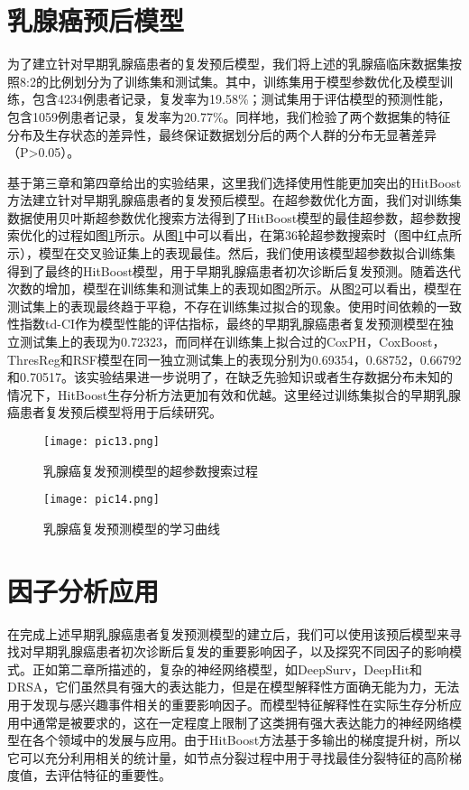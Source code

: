 \section{乳腺癌预后模型}
为了建立针对早期乳腺癌患者的复发预后模型，我们将上述的乳腺癌临床数据集按照8:2的比例划分为了训练集和测试集。其中，训练集用于模型参数优化及模型训练，包含4234例患者记录，复发率为19.58\%；测试集用于评估模型的预测性能，包含1059例患者记录，复发率为20.77\%。同样地，我们检验了两个数据集的特征分布及生存状态的差异性，最终保证数据划分后的两个人群的分布无显著差异（P>0.05）。

基于第三章和第四章给出的实验结果，这里我们选择使用性能更加突出的HitBoost方法建立针对早期乳腺癌患者的复发预后模型。在超参数优化方面，我们对训练集数据使用贝叶斯超参数优化搜索方法得到了HitBoost模型的最佳超参数，超参数搜索优化的过程如图\ref{pic13}所示。从图\ref{pic13}中可以看出，在第36轮超参数搜索时（图中红点所示），模型在交叉验证集上的表现最佳。然后，我们使用该模型超参数拟合训练集得到了最终的HitBoost模型，用于早期乳腺癌患者初次诊断后复发预测。随着迭代次数的增加，模型在训练集和测试集上的表现如图\ref{pic14}所示。从图\ref{pic14}可以看出，模型在测试集上的表现最终趋于平稳，不存在训练集过拟合的现象。使用时间依赖的一致性指数td-CI作为模型性能的评估指标，最终的早期乳腺癌患者复发预测模型在独立测试集上的表现为0.72323，而同样在训练集上拟合过的CoxPH，CoxBoost，ThresReg和RSF模型在同一独立测试集上的表现分别为0.69354，0.68752，0.66792和0.70517。该实验结果进一步说明了，在缺乏先验知识或者生存数据分布未知的情况下，HitBoost生存分析方法更加有效和优越。这里经过训练集拟合的早期乳腺癌患者复发预后模型将用于后续研究。

\begin{figure}[H]
\texttt{[image: pic13.png]}
\caption{乳腺癌复发预测模型的超参数搜索过程}
\label{pic13}
\end{figure}

\begin{figure}[H]
\texttt{[image: pic14.png]}
\caption{乳腺癌复发预测模型的学习曲线}
\label{pic14}
\end{figure}

\section{因子分析应用}
在完成上述早期乳腺癌患者复发预测模型的建立后，我们可以使用该预后模型来寻找对早期乳腺癌患者初次诊断后复发的重要影响因子，以及探究不同因子的影响模式。正如第二章所描述的，复杂的神经网络模型，如DeepSurv，DeepHit和DRSA，它们虽然具有强大的表达能力，但是在模型解释性方面确无能为力，无法用于发现与感兴趣事件相关的重要影响因子。而模型特征解释性在实际生存分析应用中通常是被要求的，这在一定程度上限制了这类拥有强大表达能力的神经网络模型在各个领域中的发展与应用。由于HitBoost方法基于多输出的梯度提升树，所以它可以充分利用相关的统计量，如节点分裂过程中用于寻找最佳分裂特征的高阶梯度值，去评估特征的重要性。

